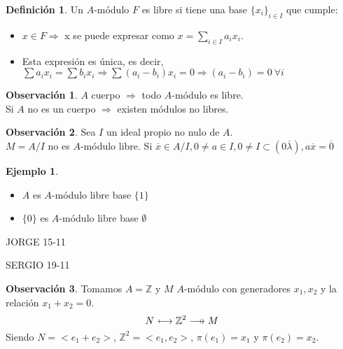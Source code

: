 \documentclass{article}
\def\flechaSobreyectiva{\mathrel{\mkern16mu  \vcenter{\hbox{$\scriptscriptstyle+$}}%
		\mkern-25mu{\longrightarrow}}}
\def\flechaInyectiva{\mathrel{\mkern0mu  \vcenter{\hbox{$\scriptscriptstyle+$}}%
		\mkern-9mu{\longrightarrow}}}
\theoremstyle{theorem-style}  %
\theoremstyle{definition}
\newtheorem{definition}{Definición}[section]
\newtheorem*{observation}{Observación} %
\theoremstyle{example-style}
\newtheorem{example}{Ejemplo}[section]
\begin{document}
\begin{definition}
	Un $ A $-módulo $ F $ es libre si tiene una base $\{x_i\}_{i\in I}$ que cumple:
	\begin{itemize}
		\item $x\in F\Rightarrow$ x se puede expresar como $x=\sum_{i\in I}a_i x_i$.
		\item Esta expresión es única, es decir, $\sum a_i x_i=\sum b_i x_i \Rightarrow \sum (a_i-b_i)x_i=0\Rightarrow (a_i-b_i)=0 \ \forall i$
	\end{itemize}
\end{definition}
\begin{observation}
	$ A $ cuerpo $ \Rightarrow $ todo $ A $-módulo es libre. \\
	Si $ A $ no es un cuerpo $ \Rightarrow $ existen módulos no libres.
\end{observation}
\begin{observation}
	Sea $ I $ un ideal propio no nulo de $ A $.\\
	$ M=A/I $ no es $ A $-módulo libre.
	Si $ \overline{x} \in A/I, 0\neq a\in I, 0\neq I \subset (0\overline{\lambda}), a\overline{x}=\overline{0} $
\end{observation}
\begin{example}
	\begin{itemize}
		\item $ A $ es $ A $-módulo libre base $ \{1\} $
		\item $ \{0\} $ es $ A $-módulo libre base $ \emptyset $
	\end{itemize}
\end{example}
JORGE 15-11

SERGIO 19-11

\begin{observation}
	Tomamos $A=\mathbb{Z}$ y $M$ $A$-módulo con generadores $x_1,x_2$ y la relación $x_1+x_2=0$.
	\[ N \flechaInyectiva \mathbb{Z}^2 \flechaSobreyectiva M\]
	Siendo $N=<e_1+e_2>$, $\mathbb{Z}^2=<e_1,e_2>$, $\pi(e_1)=x_1$ y $\pi(e_2)=x_2$.
\end{observation}
\end{document}

